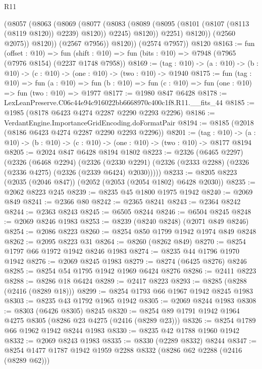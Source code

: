 \begin{lexlean}{R11}
\begin{coremodule}
                  (@8057
                    (@8063
                      (@8069
                        (@8077
                          (@8083
                            (@8089 (@8095 (@8101 (@8107 (@8113 (@8119 @8120)) @2239) @8120)) @2245)
                            @8120))
                        @2251)
                      @8120))
                  (@2560 @2075))
                @8120))
            (@2567 @7956))
          @8120))
      (@2574 @7957))
    @8120
@8163 := fun (offset : @10) =>
  fun (shift : @10) => fun (bits : @10) => @7948 (@7965 (@7976 @8154) (@2237 @1748 @7958))
@8169 := (tag : @10) -> (a : @10) -> (b : @10) -> (c : @10) -> (one : @10) -> (two : @10) -> @1940
@8175 := fun (tag : @10) =>
  fun (a : @10) => fun (b : @10) => fun (c : @10) => fun (one : @10) => fun (two : @10) => @1977
@8177 := @1980 @847 @6428
@8178 := LexLeanPreserve.C06c44e94c916022bb6668970c400c1f8.R11.__fits_44
@8185 := @1985 (@8178 @6423 @4274 @2287 @2290 @2293 @2296)
@8186 := VerdantEngine.ImportanceGridEncoding.doFormatPair
@8194 := @8185 (@2018 (@8186 @6423 @4274 @2287 @2290 @2293 @2296))
@8201 := (tag : @10) ->
  (a : @10) -> (b : @10) -> (c : @10) -> (one : @10) -> (two : @10) -> @8177 @8194
@8205 := @2024 @847 @6428 @8194 @1802
@8223 := @2326
    (@6465 @2297)
    (@2326
      (@6468 @2294)
      (@2326 (@2330 @2291) (@2326 (@2333 @2288) (@2326 (@2336 @4275) (@2326 (@2339 @6424) @2030)))))
@8233 := @8205 @8223 (@2035 (@2046 @847)) (@2052 (@2053 (@2054 @1802) @6428 @2030))
@8235 := @2062 @8223 @245
@8239 := @8235 @45 @1800 @1975 @1942
@8240 := @2069 @849
@8241 := @2366 @80
@8242 := @2365 @8241
@8243 := @2364 @8242
@8244 := @2363 @8243
@8245 := @6505 @8244
@8246 := @6504 @8245
@8248 := @2069 @8246 @1983
@8253 := @8239 (@8240 @8248) (@2071 @849 @8246)
@8254 := @2086 @8223
@8260 := @8254 @850 @1799 @1942 @1974 @849 @8248
@8262 := @2095 @8223 @31
@8264 := @8260 (@8262 @849)
@8270 := @8254 @1797 @66 @1972 @1942 @8246 @1983
@8274 := @8235 @44 @1796 @1970 @1942
@8276 := @2069 @8245 @1983
@8279 := @8274 (@6425 @8276) @8246
@8285 := @8254 @54 @1795 @1942 @1969 @6424 @8276
@8286 := @2411 @8223
@8288 := @8286 @18 @6424
@8289 := @2417 @8223
@8293 := @8285 (@8288 (@2416 (@8289 @18)))
@8299 := @8254 @1793 @66 @1967 @1942 @8245 @1983
@8303 := @8235 @43 @1792 @1965 @1942
@8305 := @2069 @8244 @1983
@8308 := @8303 (@6426 @8305) @8245
@8320 := @8254 @89 @1791 @1942 @1964 @4275 @8305 (@8286 @23 @4275 (@2416 (@8289 @23)))
@8326 := @8254 @1789 @66 @1962 @1942 @8244 @1983
@8330 := @8235 @42 @1788 @1960 @1942
@8332 := @2069 @8243 @1983
@8335 := @8330 (@2289 @8332) @8244
@8347 := @8254 @1477 @1787 @1942 @1959 @2288 @8332 (@8286 @62 @2288 (@2416 (@8289 @62)))

\end{coremodule}
\end{lexlean}
